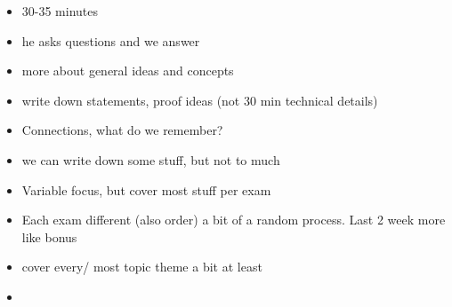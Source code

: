 \begin{itemize}
    \item 30-35 minutes
    \item he asks questions and we answer
    \item more about general ideas and concepts
    \item write down statements, proof ideas (not 30 min technical details)
    \item Connections, what do we remember?
    \item we can write down some stuff, but not to much 
    \item Variable focus, but cover most stuff per exam
    \item Each exam different (also order) a bit of a random process. Last 2 week more like bonus 
    \item cover every/ most topic theme a bit at least 
    \item 
\end{itemize}

